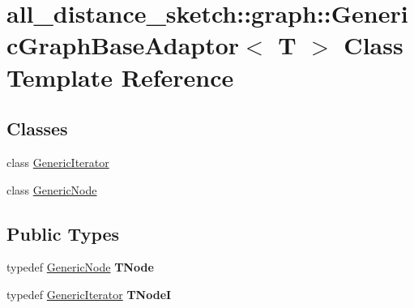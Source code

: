 \hypertarget{classall__distance__sketch_1_1graph_1_1GenericGraphBaseAdaptor}{}\section{all\+\_\+distance\+\_\+sketch\+:\+:graph\+:\+:Generic\+Graph\+Base\+Adaptor$<$ T $>$ Class Template Reference}
\label{classall__distance__sketch_1_1graph_1_1GenericGraphBaseAdaptor}
\subsection*{Classes}
\begin{DoxyCompactItemize}
\item 
class \hyperlink{classall__distance__sketch_1_1graph_1_1GenericGraphBaseAdaptor_1_1GenericIterator}{Generic\+Iterator}
\item 
class \hyperlink{classall__distance__sketch_1_1graph_1_1GenericGraphBaseAdaptor_1_1GenericNode}{Generic\+Node}
\end{DoxyCompactItemize}
\subsection*{Public Types}
\begin{DoxyCompactItemize}
\item 
\hypertarget{classall__distance__sketch_1_1graph_1_1GenericGraphBaseAdaptor_a407daba5959fb539baca52cc1b89f3c0}{}typedef \hyperlink{classall__distance__sketch_1_1graph_1_1GenericGraphBaseAdaptor_1_1GenericNode}{Generic\+Node} {\bfseries T\+Node}\label{classall__distance__sketch_1_1graph_1_1GenericGraphBaseAdaptor_a407daba5959fb539baca52cc1b89f3c0}

\item 
\hypertarget{classall__distance__sketch_1_1graph_1_1GenericGraphBaseAdaptor_a3e58001f1e49273a05128e97c53cdb35}{}typedef \hyperlink{classall__distance__sketch_1_1graph_1_1GenericGraphBaseAdaptor_1_1GenericIterator}{Generic\+Iterator} {\bfseries T\+Node\+I}\label{classall__distance__sketch_1_1graph_1_1GenericGraphBaseAdaptor_a3e58001f1e49273a05128e97c53cdb35}

\end{DoxyCompactItemize}
